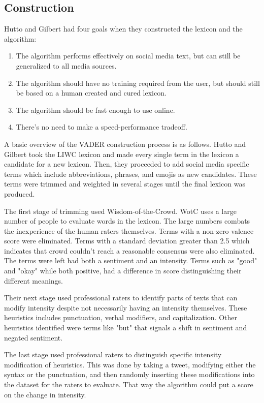 \documentclass[11pt, twoside, reqno]{book}
\begin{document}
\subsection{Construction}
\hspace{0.2in}Hutto and Gilbert had four goals when they constructed the lexicon and the algorithm:
\begin{enumerate}
	\item The algorithm performs effectively on social media text, but can still be generalized to all media sources. 
	\item The algorithm should have no training required from the user, but should still be based on a human created and cured lexicon. 
	\item The algorithm should be fast enough to use online.
	\item There's no need to make a speed-performance tradeoff. 
\end{enumerate}

A basic overview of the VADER construction process is as follows. Hutto and Gilbert took the LIWC lexicon and made every single term in the lexicon a candidate for a new lexicon. Then, they proceeded to add social media specific terms which include abbreviations, phrases, and emojis as new candidates. These terms were trimmed and weighted in several stages until the final lexicon was produced. 

The first stage of trimming used Wisdom-of-the-Crowd. WotC uses a large number of people to evaluate words in the lexicon. The large numbers combats the inexperience of the human raters themselves. Terms with a non-zero valence score were eliminated. Terms with a standard deviation greater than 2.5 which indicates that crowd couldn't reach a reasonable consensus were also eliminated. The terms were left had both a sentiment and an intensity. Terms such as "good" and "okay" while both positive, had a difference in score distinguishing their different meanings. 

Their next stage used professional raters to identify parts of texts that can modify intensity despite not necessarily having an intensity themselves. These heuristics includes punctuation, verbal modifiers, and capitalization. Other heuristics identified were terms like "but" that signals a shift in sentiment and negated sentiment. 

The last stage used professional raters to distinguish specific intensity modification of heuristics. This was done by taking a tweet, modifying either the syntax or the punctuation, and then randomly inserting these modifications into the dataset for the raters to evaluate. That way the algorithm could put a score on the change in intensity. 
\end{document}
